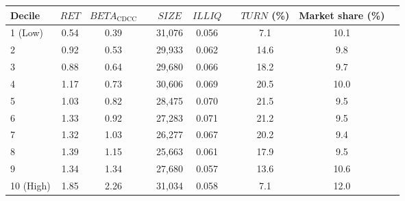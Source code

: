 \begin{tabular}{@{}lccccccccc@{}}
	\toprule
	Decile & $\textit{RET}$ & $\textit{BETA}_\textrm{CDCC}$ && $\textit{SIZE}$ & $\textit{ILLIQ}$ && $\textit{TURN}$ (\%) & Market share (\%) \\ \midrule
1 (Low) & 0.54 & 0.39 && 31,076 & 0.056 && 7.1 & 10.1 \\
2       & 0.92 & 0.53 && 29,933 & 0.062 && 14.6 & 9.8 \\
3       & 0.88 & 0.64 && 29,680 & 0.066 && 18.2 & 9.7 \\
4       & 1.17 & 0.73 && 30,606 & 0.069 && 20.5 & 10.0 \\
5       & 1.03 & 0.82 && 28,475 & 0.070 && 21.5 & 9.5 \\
6       & 1.33 & 0.92 && 27,283 & 0.071 && 21.2 & 9.5 \\
7       & 1.32 & 1.03 && 26,277 & 0.067 && 20.2 & 9.4 \\
8       & 1.39 & 1.15 && 25,663 & 0.061 && 17.9 & 9.5 \\
9       & 1.34 & 1.34 && 27,680 & 0.057 && 13.6 & 10.6 \\
10 (High) & 1.85 & 2.26 && 31,034 & 0.058 && 7.1 & 12.0 \\
	\bottomrule
\end{tabular}